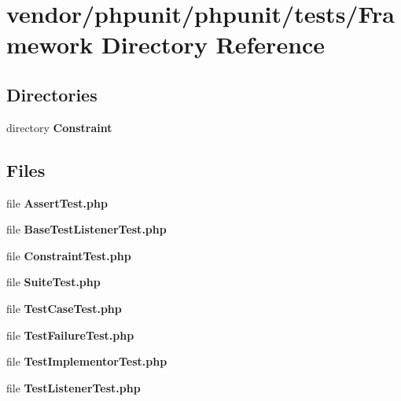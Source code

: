 \section{vendor/phpunit/phpunit/tests/\+Framework Directory Reference}
\label{dir_8fce0435f38e0f6f381758ec51cf5aef}
\subsection*{Directories}
\begin{DoxyCompactItemize}
\item 
directory {\bf Constraint}
\end{DoxyCompactItemize}
\subsection*{Files}
\begin{DoxyCompactItemize}
\item 
file {\bf Assert\+Test.\+php}
\item 
file {\bf Base\+Test\+Listener\+Test.\+php}
\item 
file {\bf Constraint\+Test.\+php}
\item 
file {\bf Suite\+Test.\+php}
\item 
file {\bf Test\+Case\+Test.\+php}
\item 
file {\bf Test\+Failure\+Test.\+php}
\item 
file {\bf Test\+Implementor\+Test.\+php}
\item 
file {\bf Test\+Listener\+Test.\+php}
\end{DoxyCompactItemize}
